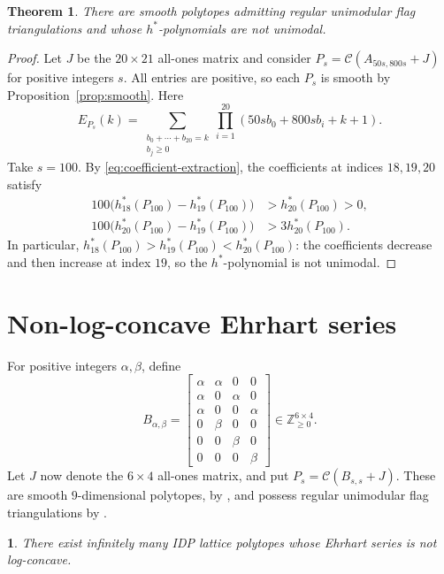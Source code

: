 \documentclass[11pt, letterpaper, english]{amsart}
\theoremstyle{teoremas}
\newtheorem{theorem}{Theorem}[section]
\newcommand{\repeatedtheoremname}{}
\newtheorem*{repeatedtheorem}{\repeatedtheoremname}
\newenvironment{restate}[1]{%
  \renewcommand{\repeatedtheoremname}{Theorem~\hyperref[#1]{\ref*{#1}}}%
  \begin{repeatedtheorem}%
}{\end{repeatedtheorem}}
\theoremstyle{definition}
\newcommand{\Z}{\mathbb{Z}}
\newcommand{\cC}{\mathcal C}
\begin{document}
\begin{theorem}\label{thm:smooth-unimodality}
There are smooth polytopes admitting regular unimodular flag triangulations and whose $h^*$-polynomials are not unimodal.
\end{theorem}
\begin{proof}
Let $J$ be the $20\times21$ all-ones matrix and consider
$P_s=\cC(A_{50s,800s}+J)$ for positive integers $s$.
All entries are positive, so each $P_s$ is smooth by
Proposition~\ref{prop:smooth}. Here
\[
 E_{P_s}(k)=\sum_{\substack{b_0+\cdots+b_{20}=k\\b_j\ge0}}
                \prod_{i=1}^{20}(50sb_0+800sb_i+k+1).
\]
Take $s=100$. By \eqref{eq:coefficient-extraction}, the coefficients
at indices $18,19,20$ satisfy
\begin{align*}
 100\bigl(h_{18}^*(P_{100})-h_{19}^*(P_{100})\bigr)&>h_{20}^*(P_{100})>0,\\
 100\bigl(h_{20}^*(P_{100})-h_{19}^*(P_{100})\bigr)&>3h_{20}^*(P_{100}).
\end{align*}
In particular, $h_{18}^*(P_{100})>h_{19}^*(P_{100})<h_{20}^*(P_{100})$:
the coefficients decrease and then increase at index $19$, so the
$h^*$-polynomial is not unimodal.
\end{proof}

\section{Non-log-concave Ehrhart series}\label{sec:series}

For positive integers $\alpha,\beta$, define
\[
 B_{\alpha,\beta}=
 \begin{bmatrix}
 \alpha&\alpha&0&0\\
 \alpha&0&\alpha&0\\
 \alpha&0&0&\alpha\\
 0&\beta&0&0\\
 0&0&\beta&0\\
 0&0&0&\beta
 \end{bmatrix}\in\Z_{\ge0}^{6\times4}.
\]
Let $J$ now denote the $6\times4$ all-ones matrix, and put
$P_s=\cC(B_{s,s}+J)$. These are smooth $9$-dimensional polytopes,
by , and possess regular unimodular
flag triangulations by .

\begin{restate}{thm:main-series}
There exist infinitely many IDP lattice polytopes whose Ehrhart series is not log-concave.
\end{restate}
\end{document}
